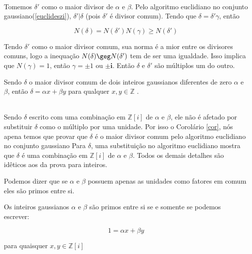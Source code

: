 \\
	Tomemos $\delta'$ como o maior divisor de $\alpha$ e $\beta$. Pelo algoritmo euclidiano no conjunto gaussiano(\ref{euclideszi}), $\delta' | \delta$ (pois $\delta'$ \'e divisor comum). Tendo que $\delta = \delta' \gamma$, ent\~ao

$$N(\delta) = N(\delta')N(\gamma) \geq N(\delta')$$

Tendo $\delta'$ como o maior divisor comum, sua norma \'e a mior entre os divisores comuns, logo a inequa\c{c}\~ao $N(\delta) \geg N(\delta')$ tem de ser uma igualdade. Isso implica que $N(\gamma) = 1$, ent\~ao $\gamma = \pm 1$ ou $\pm \textbf{i}$. Ent\~ao $\delta$ e $\delta'$ s\~ao m\'ultiplos um do outro.

\hfill\newline

\begin{Th} \label{teoprimosentresi}
	Sendo $\delta$ o maior divisor comum de dois inteiros gaussianos diferentes de zero $\alpha$ e $\beta$, ent\~ao $\delta = \alpha x + \beta y$ para qualquer $x, y \in \mathbb{Z}$ .
\end{Th}


\\

Sendo $\delta$ escrito com uma combina\c{c}\~ao em $\mathbb{Z}[i]$ de $\alpha$ e $\beta$, ele n\~ao \'e afetado por substituir $\delta$ como o m\'ultiplo por uma unidade. Por isso o Corol\'ario \ref{cor}, n\'os apena temos que provar que $\delta$ \'e o maior divisor comum pelo algoritmo euclidiano no conjunto gaussiano Para $\delta$, uma substitui\c{c}\~ao no algoritmo euclidiano mostra que $\delta$ \'e uma combina\c{c}\~ao em $\mathbb{Z}[i]$ de $\alpha$ e $\beta$. Todos os demais detalhes s\~ao id\^eticos aos da prova para inteiros.

\hfill\newline

Podemos dizer que se $\alpha$ e $\beta$ possuem apenas as unidades como fatores em comum eles s\~ao primos entre si. 

\begin{Cor} \label{primosentresi}

Os inteiros gaussianos $\alpha$ e $\beta$ s\~ao primos entre si se e somente se podemos escrever:

$$1 = \alpha x + \beta y$$

para quaisquer $x, y \in \mathbb{Z}[i]$

\end{Cor}
\\

